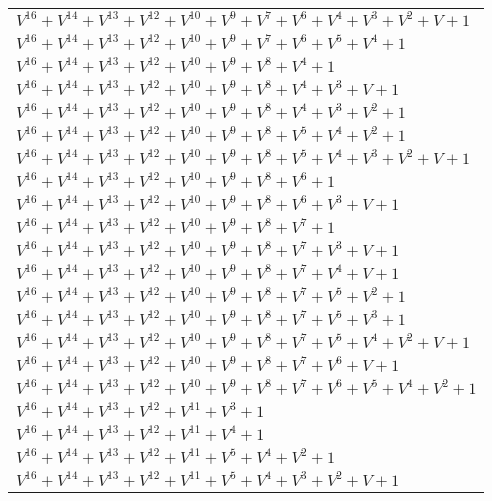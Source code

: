 \documentclass[12pt]{article}
\begin{document}
\begin{adjustwidth}{-4cm}{}
\begin{center}
\begin{longtable}{|l|}
$V^{16}  +V^{14}  +V^{13}  +V^{12}  +V^{10}  +V^{9}  +V^{7}  +V^{6}  +V^{4}  +V^{3}  +V^{2}  + V + 1$ \\
$V^{16}  +V^{14}  +V^{13}  +V^{12}  +V^{10}  +V^{9}  +V^{7}  +V^{6}  +V^{5}  +V^{4}  + 1$ \\
$V^{16}  +V^{14}  +V^{13}  +V^{12}  +V^{10}  +V^{9}  +V^{8}  +V^{4}  + 1$ \\
$V^{16}  +V^{14}  +V^{13}  +V^{12}  +V^{10}  +V^{9}  +V^{8}  +V^{4}  +V^{3}  + V + 1$ \\
$V^{16}  +V^{14}  +V^{13}  +V^{12}  +V^{10}  +V^{9}  +V^{8}  +V^{4}  +V^{3}  +V^{2}  + 1$ \\
$V^{16}  +V^{14}  +V^{13}  +V^{12}  +V^{10}  +V^{9}  +V^{8}  +V^{5}  +V^{4}  +V^{2}  + 1$ \\
$V^{16}  +V^{14}  +V^{13}  +V^{12}  +V^{10}  +V^{9}  +V^{8}  +V^{5}  +V^{4}  +V^{3}  +V^{2}  + V + 1$ \\
$V^{16}  +V^{14}  +V^{13}  +V^{12}  +V^{10}  +V^{9}  +V^{8}  +V^{6}  + 1$ \\
$V^{16}  +V^{14}  +V^{13}  +V^{12}  +V^{10}  +V^{9}  +V^{8}  +V^{6}  +V^{3}  + V + 1$ \\
$V^{16}  +V^{14}  +V^{13}  +V^{12}  +V^{10}  +V^{9}  +V^{8}  +V^{7}  + 1$ \\
$V^{16}  +V^{14}  +V^{13}  +V^{12}  +V^{10}  +V^{9}  +V^{8}  +V^{7}  +V^{3}  + V + 1$ \\
$V^{16}  +V^{14}  +V^{13}  +V^{12}  +V^{10}  +V^{9}  +V^{8}  +V^{7}  +V^{4}  + V + 1$ \\
$V^{16}  +V^{14}  +V^{13}  +V^{12}  +V^{10}  +V^{9}  +V^{8}  +V^{7}  +V^{5}  +V^{2}  + 1$ \\
$V^{16}  +V^{14}  +V^{13}  +V^{12}  +V^{10}  +V^{9}  +V^{8}  +V^{7}  +V^{5}  +V^{3}  + 1$ \\
$V^{16}  +V^{14}  +V^{13}  +V^{12}  +V^{10}  +V^{9}  +V^{8}  +V^{7}  +V^{5}  +V^{4}  +V^{2}  + V + 1$ \\
$V^{16}  +V^{14}  +V^{13}  +V^{12}  +V^{10}  +V^{9}  +V^{8}  +V^{7}  +V^{6}  + V + 1$ \\
$V^{16}  +V^{14}  +V^{13}  +V^{12}  +V^{10}  +V^{9}  +V^{8}  +V^{7}  +V^{6}  +V^{5}  +V^{4}  +V^{2}  + 1$ \\
$V^{16}  +V^{14}  +V^{13}  +V^{12}  +V^{11}  +V^{3}  + 1$ \\
$V^{16}  +V^{14}  +V^{13}  +V^{12}  +V^{11}  +V^{4}  + 1$ \\
$V^{16}  +V^{14}  +V^{13}  +V^{12}  +V^{11}  +V^{5}  +V^{4}  +V^{2}  + 1$ \\
$V^{16}  +V^{14}  +V^{13}  +V^{12}  +V^{11}  +V^{5}  +V^{4}  +V^{3}  +V^{2}  + V + 1$ \\

\end{longtable}
\end{center}
\end{adjustwidth}
\end{document}
